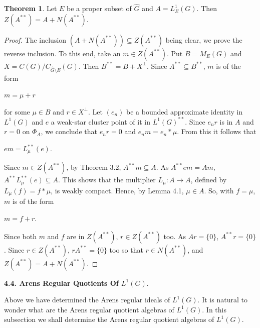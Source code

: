 \documentclass[12pt, twoside, leqno]{article}
\theoremstyle{definition}
\newtheorem{theorem}{Theorem}[section]
\theoremstyle{definition}
\numberwithin{equation}{section}
\begin{document}
\begin{theorem} Let $ E $ be a proper subset of $ \hat{G} $ and $ A=L^{1}_{E}(G) $. Then	$ Z(A^{**})=A+ N(A^{**}) $.
	
\end{theorem}
\begin{proof}
	The inclusion $(A+N(A^{**}))\subseteq Z(A^{**}) $ being clear, we prove the reverse inclusion. To this end, take an $ m\in Z(A^{**}) $. Put $ B=M_{E}(G) $ and $ X=C(G)/C_{\hat{G}\setminus E}(G) $. Then $ B^{**}=B+X^{\perp} $. Since $ A^{**}\subseteq B^{**} $, $ m $ is of the form\vspace{2mm}
	
	$ m=\mu +r$ \vspace{2mm}
	
	\noindent for some $ \mu \in B$ and $ r\in X^{\perp} $. Let $ (e_{n}) $ be a bounded approximate identity in $ L^{1}(G) $ and $ e $ a weak-star cluster point of it in $ L^{1}(G)^{**} $. Since $ e_{n}r $ is in $ A $ and $ r=0 $ on $ \Phi_{A} $, we conclude that $ e_{n}r=0 $ and $ e_{n}m=e_{n}*\mu $. From this it follows that \vspace{2mm}
	
	$ em=L_{\mu}^{**}(e) $.\vspace{2mm}
	
		\noindent Since $ m\in Z(A^{**}) $, by Theorem 3.2, $ A^{**}m\subseteq A $. As $ A^{**}em=Am $, $ A^{**}L^{**}_{\mu}(e)\subseteq A $. This shows that the multiplier $ L_{\mu}:A\rightarrow A $, defined by $ L_{\mu}(f)=f*\mu $, is weakly compact. Hence, by Lemma 4.1, $ \mu\in A $. So, with $ f=\mu $, $ m $ is of the form\vspace{2mm}
	
	$ m=f+r $. \vspace{2mm}
	
	\noindent Since both  $ m $ and $ f $ are in $ Z(A^{**}) $, $ r\in Z(A^{**}) $ too. As $ Ar=\{0\} $, $ A^{**}r=\{0\} $. Since $ r\in Z(A^{**}) $, $ rA^{**}=\{0\} $ too so that $ r\in N(A^{**}) $, and $ Z(A^{**})=A+N(A^{**}) $. 
	
	
\end{proof}

 \textbf{4.4. Arens Regular Quotients Of $ L^{1}(G) $}.\vspace{2mm}

 Above we have determined the Arens regular ideals of $ L^{1}(G) $. It is natural to wonder what are the Arens regular quotient algebras of $ L^{1}(G) $. In this subsection we shall determine the Arens regular quotient algebras of $ L^{1}(G) $.\vspace{2mm}
\end{document}
